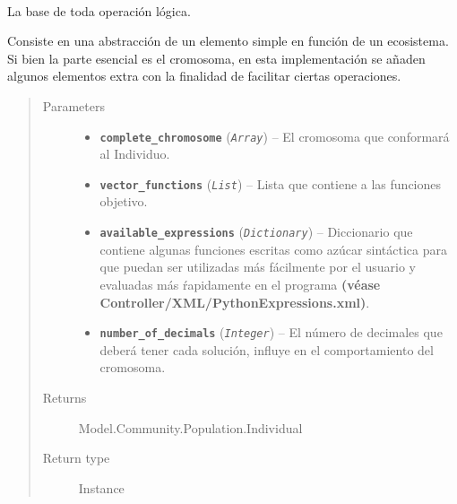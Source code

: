 \documentclass[letterpaper,10pt,english]{sphinxmanual}
\begin{document}
\begin{fulllineitems}
\label{Model/Community/Population/Individual/Individual:Model.Community.Population.Individual.Individual.Individual}~
\begin{DUlineblock}{0em}
\item[] La base de toda operación lógica.
\item[] Consiste en una abstracción de un elemento simple en función de un ecosistema.
Si bien la parte esencial es el cromosoma, en esta implementación se añaden algunos elementos extra
con la finalidad de facilitar ciertas operaciones.
\end{DUlineblock}
\begin{quote}\begin{description}
\item[{Parameters}] \leavevmode\begin{itemize}
\item {} 
\textbf{\texttt{complete\_chromosome}} (\emph{\texttt{Array}}) -- El cromosoma que conformará al Individuo.

\item {} 
\textbf{\texttt{vector\_functions}} (\emph{\texttt{List}}) -- Lista que contiene a las funciones objetivo.

\item {} 
\textbf{\texttt{available\_expressions}} (\emph{\texttt{Dictionary}}) -- Diccionario que contiene algunas funciones escritas como azúcar sintáctica
para que puedan ser utilizadas más fácilmente por el usuario y evaluadas
más ŕapidamente en el programa \textbf{(véase Controller/XML/PythonExpressions.xml)}.

\item {} 
\textbf{\texttt{number\_of\_decimals}} (\emph{\texttt{Integer}}) -- El número de decimales que deberá tener cada solución, influye en el
comportamiento del cromosoma.

\end{itemize}

\item[{Returns}] \leavevmode
Model.Community.Population.Individual

\item[{Return type}] \leavevmode
Instance

\end{description}\end{quote}


\end{fulllineitems}
\end{document}
